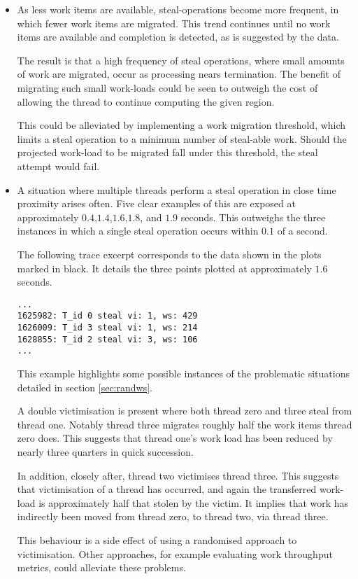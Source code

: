 \begin{itemize}
\item 
    As less work items are available, steal-operations become more frequent, in which fewer work items are migrated. 
    This trend continues until no work items are available and completion is detected, as is suggested by the data.

    The result is that a high frequency of steal operations, where small amounts of work are
    migrated, occur as processing nears termination. The benefit of migrating such small work-loads could
    be seen to outweigh the cost of allowing the thread to continue computing the given region.
    
    This could be alleviated by implementing a work migration threshold, which limits a steal operation 
    to a minimum number of steal-able work. Should the projected work-load to be migrated fall under 
    this threshold, the steal attempt would fail. 

\item 
    A situation where multiple threads perform a steal operation in close time proximity arises often.
    Five clear examples of this are exposed at approximately \(0.4\),\(1.4\),\(1.6\),\(1.8\), and \(1.9\) seconds.
    This outweighs the three instances in which a single steal operation occurs within \(0.1\) of a second.

    The following trace excerpt corresponds to the data shown in the plots marked in black. 
    It details the three points plotted at approximately \(1.6\) seconds.

\begin{lstlisting}
...
1625982: T_id 0 steal vi: 1, ws: 429
1626009: T_id 3 steal vi: 1, ws: 214
1628855: T_id 2 steal vi: 3, ws: 106
...
\end{lstlisting}
    
    This example highlights some possible instances of the problematic situations detailed in section \ref{sec:randws}. 
    
    A double victimisation is present where both thread zero and three steal from thread one. Notably thread three 
    migrates roughly half the work items thread zero does. This suggests that thread one's work load has been reduced
    by nearly three quarters in quick succession.
    
    In addition, closely after, thread two victimises thread three. This suggests that victimisation of a thread has occurred,
    and again the transferred work-load is approximately half that stolen by the victim. It implies that work has indirectly 
    been moved from thread zero, to thread two, via thread three.
    
    This behaviour is a side effect of using a randomised approach to victimisation. Other approaches, for example evaluating work
    throughput metrics, could alleviate these problems.
\end{itemize}

